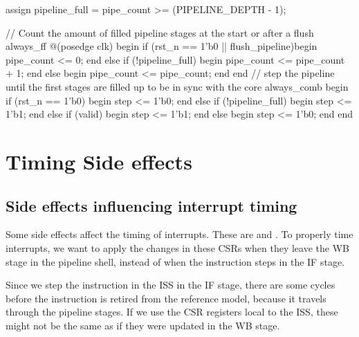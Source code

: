 \begin{systemverilog}[label={lst:pipe_count}, caption={Systemverilog code for filling the pipeline at the start and after a flush.}]

assign pipeline_full = pipe_count >= (PIPELINE_DEPTH - 1);

// Count the amount of filled pipeline stages at the start or after a flush 
always_ff @(posedge clk) begin
    if (rst_n == 1'b0 || flush_pipeline)begin 
        pipe_count <= 0;
    end else if (!pipeline_full) begin
        pipe_count <= pipe_count + 1;
    end else begin
        pipe_count <= pipe_count;
    end
end
// step the pipeline until the first stages are filled up to be in sync with the core
always_comb begin
    if (rst_n == 1'b0) begin
        step <= 1'b0;
    end else if (!pipeline_full) begin
        step <= 1'b1;
    end
    else if (valid) begin
        step <= 1'b1;
    end
    else begin
        step <= 1'b0;
    end
end
\end{systemverilog}



\section{Timing Side effects}
\label{sec:side-effects}

\subsection{Side effects influencing interrupt timing}

Some side effects affect the timing of interrupts. These are  and . To properly time interrupts, we want to apply the changes in these CSRs when they leave the WB stage in the pipeline shell, instead of when the instruction steps in the IF stage.


Since we step the instruction in the ISS in the IF stage, there are some cycles before the instruction is retired from the reference model, because it travels through the pipeline stages. If we use the CSR registers local to the ISS, these might not be the same as if they were updated in the WB stage.

